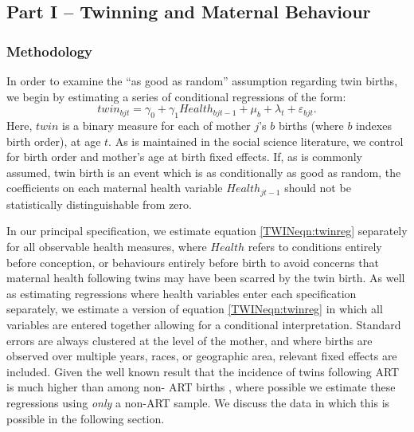 \documentclass[subeqn]{article}
\begin{document}
\begin{spacing}{1.4}
\part*{Part I -- Twinning and Maternal Behaviour}
\section{Methodology}
\label{TWINscn:method}
In order to examine the ``as good as random'' assumption regarding twin births,
we begin by estimating a series of conditional regressions of the form:
\begin{equation}
  \label{TWINeqn:twinreg}
  twin_{bjt}=\gamma_0 + \gamma_1 Health_{bjt-1} + \mu_b + \lambda_t
            + \varepsilon_{bjt}.
\end{equation}
Here, $twin$ is a binary measure for each of mother $j$'s $b$ births (where $b$
indexes birth order), at age $t$.  As is maintained in the social science
literature, we control for birth order and mother's age at birth fixed effects.
If, as is commonly assumed, twin birth is an event which is as conditionally as
good as random, the coefficients on each maternal health variable
$Health_{jt-1}$ should not be statistically distinguishable from zero.

In our principal specification, we estimate equation \ref{TWINeqn:twinreg}
separately for all observable health measures, where $Health$ refers to
conditions entirely before conception, or behaviours entirely before birth to
avoid concerns that maternal health following twins may have been scarred by the
twin birth.  As well as estimating regressions where health variables enter
each specification separately, we estimate a version of equation
\ref{TWINeqn:twinreg} in which all variables are entered together allowing for
a conditional interpretation.  Standard errors are always clustered at the
level of the mother, and where births are observed over multiple years, races,
or geographic area, relevant fixed effects are included.  Given the well known
result that the incidence of twins following ART is much higher than among non-%
ART births \citep{Vitthalaetal2009}, where possible we estimate these
regressions using \emph{only} a non-ART sample.  We discuss the data in which
this is possible in the following section.


\end{spacing}
\end{document}
